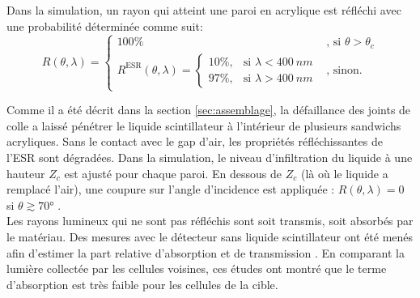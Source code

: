 Dans la simulation, un rayon qui atteint une paroi en acrylique est réfléchi avec une probabilité déterminée comme suit:\\

\begin{equation}
    R(\theta, \lambda) =
    \begin{cases}
        100\% & \text{, si } \theta > \theta_c\\
        R^{\text{ESR}}(\theta, \lambda) =
        \begin{cases}
            10 \%, & \text{si } \lambda < \SI{400}{nm}\\
            97 \%, & \text{si } \lambda > \SI{400}{nm}
        \end{cases}
        & \text{, sinon.}
    \end{cases}
\end{equation}

\bigbreak

Comme il a été décrit dans la section \ref{sec:assemblage}, la défaillance des joints de colle a laissé pénétrer le liquide scintillateur à l'intérieur de plusieurs sandwichs acryliques. Sans le contact avec le gap d'air, les propriétés réfléchissantes de l'ESR sont dégradées. Dans la simulation, le niveau d'infiltration du liquide à une hauteur $Z_c$ est ajusté pour chaque paroi. En dessous de $Z_c$ (là où le liquide a remplacé l'air), une coupure sur l'angle d'incidence est appliquée : $R(\theta, \lambda) = 0$ si $\theta \gtrsim \ang{70}$ \cite{docdb351}.\\

Les rayons lumineux qui ne sont pas réfléchis sont soit transmis, soit absorbés par le matériau. Des mesures avec le détecteur sans liquide scintillateur ont été menés afin d'estimer la part relative d'absorption et de transmission \cite{bonhomme:tel-01931309}. En comparant la lumière collectée par les cellules voisines, ces études ont montré que le terme d'absorption est très faible pour les cellules de la cible.\\


\bigbreak



